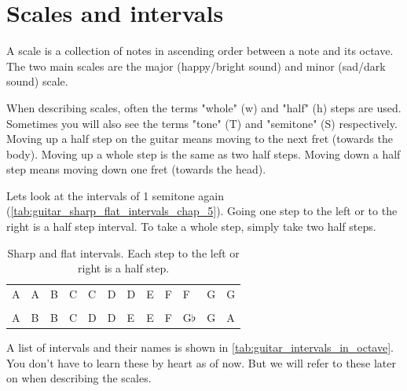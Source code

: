 \newpage

\section{Scales and intervals}

A scale is a collection of notes in ascending order between a note and its octave. The two main scales are the major (happy/bright sound) and minor (sad/dark sound) scale.

When describing scales, often the terms "whole" (w) and "half" (h) steps are used. Sometimes you will also see the terms "tone" (T) and "semitone" (S) respectively. Moving up a half step on the guitar means moving to the next fret (towards the body). Moving up a whole step is the same as two half steps. Moving down a half step means moving down one fret (towards the head).

Lets look at the intervals of 1 semitone again (\autoref{tab:guitar_sharp_flat_intervals_chap_5}). Going one step to the left or to the right is a half step interval. To take a whole step, simply take two half steps.

\begin{table}[h]
	\centering
	\begin{tabular}{*{12}{P{5mm}}}
		\large{A} & \large{A\sharp} & \large{B} & \large{C} & \large{C\sharp} & \large{D} & \large{D\sharp} & \large{E} & \large{F} & \large{F\sharp} & \large{G} & \large{G\sharp} \\ \\
		\large{A} & \large{B\flat} & \large{B} & \large{C} & \large{D\flat} & \large{D} & \large{E\flat} & \large{E} & \large{F} & \large{G$\flat$}& \large{G} & \large{A\flat}
	\end{tabular}
	\caption{Sharp and flat intervals. Each step to the left or right is a half step.}
	\label{tab:guitar_sharp_flat_intervals_chap_5}
\end{table}

A list of intervals and their names is shown in \autoref{tab:guitar_intervals_in_octave}. You don't have to learn these by heart as of now. But we will refer to these later on when describing the scales.

